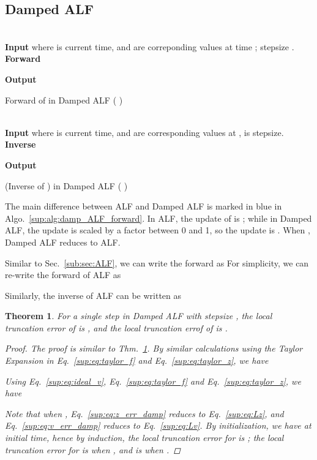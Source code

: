 \documentclass{article} \usepackage{iclr2021_conference,times}
\newtheorem{theorem}{Theorem}[section]
\begin{document}
\subsection{Damped ALF}
\label{sup:sec:damp}
\begin{algorithm}
 \\
\textbf{Input}  where  is current time,  and  are correponding values at time ; stepsize .\\
\textbf{Forward} 

\textbf{Output} \hspace{28mm} 
\caption{Forward of  in Damped ALF ({\color{blue}  })}
\label{sup:alg:damp_ALF_forward}
\end{algorithm}
\begin{algorithm}[H]
\label{alg:ALF_inverse}
 \\
\textbf{Input}  where  is current time,  and  are corresponding values at ,  is stepsize.\\
\textbf{Inverse} 

\textbf{Output} \hspace{28mm} 
\caption{  (Inverse of ) in Damped ALF ({\color{blue}  })}
\end{algorithm}
The main difference between ALF and Damped ALF is marked in blue in Algo.~\ref{sup:alg:damp_ALF_forward}. In ALF, the update of  is ; while in Damped ALF, the update is scaled by a factor  between 0 and 1, so the update is . When , Damped ALF reduces to ALF.

Similar to Sec.~\ref{sub:sec:ALF}, we can write the forward as
For simplicity, we can re-write the forward of ALF as

Similarly, the inverse of ALF can be written as


\begin{theorem}
\label{sup:theorem:truncation}
For a single step in Damped ALF with stepsize , the local truncation error of  is , and the local truncation errof of  is .
\begin{proof}
The proof is similar to Thm.~\ref{sup:theorem:truncation}. By similar calculations using the Taylor Expansion in Eq.~\ref{sup:eq:taylor_f} and Eq.~\ref{sup:eq:taylor_z}, we have

Using Eq.~\ref{sup:eq:ideal_v}, Eq.~\ref{sup:eq:taylor_f} and Eq.~\ref{sup:eq:taylor_z}, we have

Note that when , Eq.~\ref{sup:eq:z_err_damp} reduces to Eq.~\ref{sup:eq:Lz}, and Eq.~\ref{sup:eq:v_err_damp} reduces to Eq.~\ref{sup:eq:Lv}. By initialization, we have  at initial time, hence by induction, the local truncation error for  is ; the local truncation error for  is  when , and is  when .
\end{proof}
\end{theorem}
\end{document}
